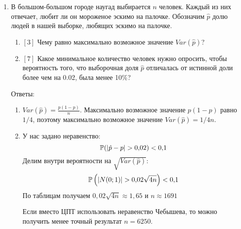 \documentclass[pdftex,12pt,a4paper]{article}
\begin{document}
\begin{enumerate}
\begin{enumerate}
\end{enumerate}



\item В большом-большом городе наугад выбирается $n$ человек. Каждый из них отвечает, любит ли он мороженое эскимо на палочке. Обозначим $\hat{p}$ долю людей в нашей выборке, любящих эскимо на палочке. 
\begin{enumerate}
\item $[3]$ Чему равно максимально возможное значение $Var(\hat{p})$?
\item $[7]$ Какое минимальное количество человек нужно опросить, чтобы вероятность того, что выборочная доля $\hat{p}$ отличалась от истинной доли более чем на 0.02, была менее 10\%?
\end{enumerate}


Ответы:
\begin{enumerate}
\item $Var(\hat{p})=\frac{p(1-p)}{n}$. Максимально возможное значение $p(1-p)$ равно $1/4$, поэтому максимально возможное значение $Var(\hat{p})=1/4n$.
\item У нас задано неравенство:
\begin{equation}
\P(|\hat{p}-p|>0{,}02)<0{,}1 
\end{equation}
Делим внутри вероятности на $\sqrt{Var(\hat{p})}$:
\begin{equation}
\P\left( |N(0;1)| > 0{,}02\sqrt{4n} \right)<0{,}1 
\end{equation}
По таблицам получаем $0{,}02\sqrt{4n}\approx 1{,}65$ и $n\approx 1691$


Если вместо ЦПТ использовать неравенство Чебышева, то можно получить менее точный результат $n=6250$.

\end{enumerate}
 



\end{enumerate}
\end{document}

